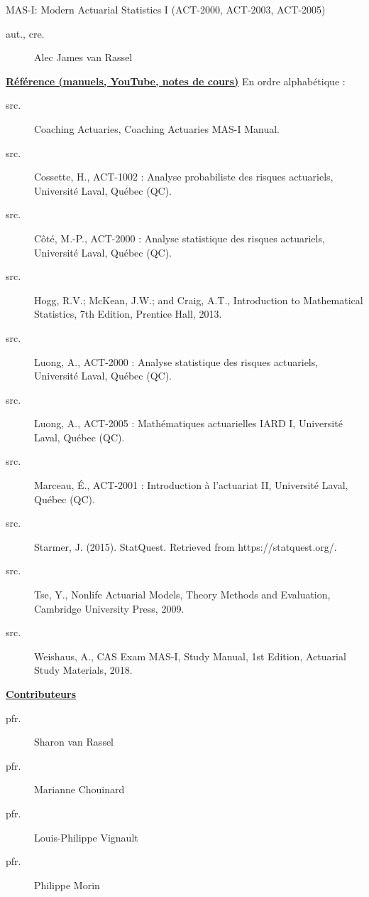 \begin{contrib}{MAS-I: Modern Actuarial Statistics I (ACT-2000, ACT-2003, ACT-2005)}
\begin{description}
	\item[aut., cre.] Alec James van Rassel
\end{description}

\textbf{\underline{Référence (manuels, YouTube, notes de cours)}}
En ordre alphabétique :
\begin{description}
	\item[src.]	Coaching Actuaries, Coaching Actuaries MAS-I Manual.
	\item[src.]	Cossette, H., ACT-1002 : Analyse probabiliste des risques actuariels, Université Laval, Québec (QC).
	\item[src.]	Côté, M.-P., ACT-2000 : Analyse statistique des risques actuariels, Université Laval, Québec (QC).
	\item[src.]	Hogg, R.V.; McKean, J.W.; and Craig, A.T., Introduction to Mathematical Statistics, 7th Edition, Prentice Hall, 2013.
	\item[src.]	Luong, A., ACT-2000 : Analyse statistique des risques actuariels, Université Laval, Québec (QC).
	\item[src.]	Luong, A., ACT-2005 : Mathématiques actuarielles IARD I, Université Laval, Québec (QC).
	\item[src.]	Marceau, É., ACT-2001 : Introduction à l'actuariat II, Université Laval, Québec (QC).
	\item[src.]	Starmer, J. (2015). StatQuest. Retrieved from https://statquest.org/.
	\item[src.]	Tse, Y., Nonlife Actuarial Models, Theory Methods and Evaluation, Cambridge University Press, 2009.
	\item[src.]	Weishaus, A., CAS Exam MAS-I, Study Manual, 1st Edition, Actuarial Study Materials, 2018.
\end{description}

\textbf{\underline{Contributeurs}}
\begin{description}
	\item[pfr.]	Sharon van Rassel
	\item[pfr.]	Marianne Chouinard
	\item[pfr.]	Louis-Philippe Vignault
	\item[pfr.]	Philippe Morin
\end{description}
\end{contrib}

